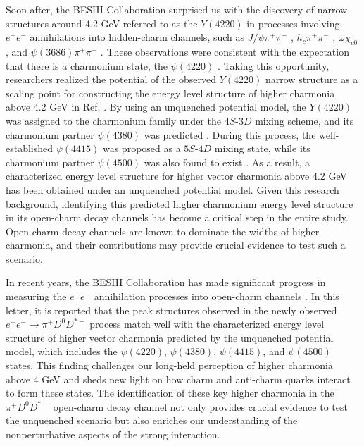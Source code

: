\documentclass[prl,twocolumn,floatfix,amsmath,nofootinbib,amssymb,floatfix]{revtex4}
\begin{document}
Soon after, the BESIII Collaboration surprised us with the discovery of narrow structures around 4.2 GeV referred to as the $Y(4220)$ in processes involving $e^+e^-$ annihilations into hidden-charm channels, such as $J/\psi\pi^+\pi^-$ \cite{BESIII:2016bnd}, $h_c\pi^+\pi^-$ \cite{BESIII:2016adj}, $\omega\chi_{c0}$ \cite{BESIII:2019gjc}, and $\psi(3686)\pi^+\pi^-$ \cite{BESIII:2017tqk}. These observations were consistent with the expectation that there is a charmonium state, the $\psi(4220)$ \cite{Chen:2014sra}. Taking this opportunity, researchers realized the potential of the observed $Y(4220)$ narrow structure as a scaling point for constructing the energy level structure of higher charmonia above 4.2 GeV in Ref. \cite{Wang:2019mhs}. By using an unquenched potential model, the $Y(4220)$ was assigned to the charmonium family under the $4S$-$3D$ mixing scheme, and its charmonium partner $\psi(4380)$ was predicted \cite{Wang:2019mhs}. During this process, the well-established $\psi(4415)$ was proposed as a $5S$-$4D$ mixing state, while its charmonium partner $\psi(4500)$ was also found to exist \cite{Wang:2019mhs,Wang:2022jxj}. As a result, a characterized energy level structure for higher vector charmonia above 4.2 GeV has been obtained under an unquenched potential model. Given this research background, identifying this predicted higher charmonium energy level structure in its open-charm decay channels has become a critical step in the entire study. Open-charm decay channels are known to dominate the widths of higher charmonia, and their contributions may provide crucial evidence to test such a scenario.


In recent years, the BESIII Collaboration has made significant progress in measuring the $e^+e^-$ annihilation processes into open-charm channels \cite{BESIII:2018iea,BESIII:2021yvc,BESIII:2022quc,BESIII:2023cmv,BESIII:2023wsc}. In this letter, it is reported that the peak structures observed in the newly observed $e^+e^-\to \pi^+ D^0 D^{*-}$ process match well with the characterized energy level structure of higher vector charmonia predicted by the unquenched potential model, which includes the $\psi(4220)$, $\psi(4380)$, $\psi(4415)$, and $\psi(4500)$ states. This finding challenges our long-held perception of higher charmonia above 4 GeV and sheds new light on how charm and anti-charm quarks interact to form these states. The identification of these key higher charmonia in the $\pi^+ D^0 D^{*-}$ open-charm decay channel not only provides crucial evidence to test the unquenched scenario but also enriches our understanding of the nonperturbative aspects of the strong interaction.
\end{document}
